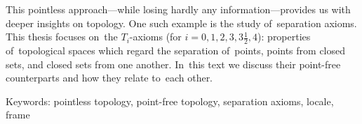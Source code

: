\documentclass[12pt,a4paper]{report}
\let\openright=\clearpage
\def\chapwithtoc#1{
\chapter*{#1}
\addcontentsline{toc}{chapter}{#1}
}
\theoremstyle{plain}
\theoremstyle{definition}
\theoremstyle{remark}
\numberwithin{equation}{section}
\begin{document}
{This pointless approach---while losing hardly any information---provides us
with deeper insights on topology.
One such example is the study of~separation axioms.
This thesis focuses on~the $T_i$-axioms (for $i = 0, 1, 2, 3, 3\frac{1}{2},
4$):
properties of~topological spaces which regard the separation of~points, points
from closed sets, and closed sets from one another.
In~this text we discuss their point-free counterparts and how they
relate to~each other.

Keywords:
pointless topology, point-free topology, separation axioms, locale, frame

\vss}

\newpage


\openright
\pagestyle{plain}
\setcounter{page}{1}
\tableofcontents









%

% 









\openright
\end{document}
